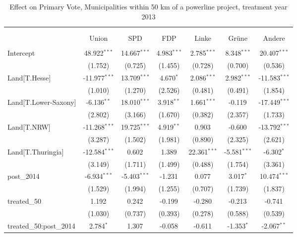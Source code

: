 \begin{table}[!htbp] \centering
  \caption{Effect on Primary Vote, Municipalities within 50 km of a powerline project, treatment year 2013}
\begin{tabular}{@{\extracolsep{5pt}}lcccccc}
\\[-1.8ex]\hline
\hline \\[-1.8ex]
\\[-1.8ex] & \multicolumn{1}{c}{Union} & \multicolumn{1}{c}{SPD} & \multicolumn{1}{c}{FDP} & \multicolumn{1}{c}{Linke} & \multicolumn{1}{c}{Grüne} & \multicolumn{1}{c}{Andere}  \\
\hline \\[-1.8ex]
 Intercept & 48.922$^{***}$ & 14.667$^{***}$ & 4.983$^{***}$ & 2.785$^{***}$ & 8.348$^{***}$ & 20.407$^{***}$ \\
  & (1.752) & (0.725) & (1.455) & (0.728) & (0.700) & (0.536) \\
 Land[T.Hesse] & -11.977$^{***}$ & 13.709$^{***}$ & 4.670$^{*}$ & 2.086$^{***}$ & 2.982$^{***}$ & -11.583$^{***}$ \\
  & (1.010) & (1.270) & (2.526) & (0.481) & (0.491) & (1.854) \\
 Land[T.Lower-Saxony] & -6.136$^{**}$ & 18.010$^{***}$ & 3.918$^{**}$ & 1.661$^{***}$ & -0.119$^{}$ & -17.449$^{***}$ \\
  & (2.802) & (3.166) & (1.670) & (0.382) & (2.357) & (1.733) \\
 Land[T.NRW] & -11.268$^{***}$ & 19.725$^{***}$ & 4.919$^{**}$ & 0.903$^{}$ & -0.600$^{}$ & -13.792$^{***}$ \\
  & (3.287) & (1.502) & (1.981) & (0.890) & (2.325) & (2.621) \\
 Land[T.Thuringia] & -12.584$^{***}$ & 0.602$^{}$ & 1.389$^{}$ & 22.361$^{***}$ & -5.581$^{***}$ & -6.302$^{*}$ \\
  & (3.149) & (1.711) & (1.499) & (0.488) & (1.754) & (3.361) \\
 post_2014 & -6.934$^{***}$ & -5.403$^{***}$ & -1.231$^{}$ & 0.077$^{}$ & 3.017$^{*}$ & 10.474$^{***}$ \\
  & (1.529) & (1.994) & (1.255) & (0.707) & (1.739) & (1.837) \\
 treated_50 & 1.192$^{}$ & 0.242$^{}$ & -0.199$^{}$ & -0.280$^{}$ & -0.213$^{}$ & -0.741$^{}$ \\
  & (1.030) & (0.737) & (0.393) & (0.278) & (0.588) & (0.539) \\
 treated_50:post_2014 & 2.784$^{*}$ & 1.307$^{}$ & -0.058$^{}$ & -0.611$^{}$ & -1.353$^{*}$ & -2.067$^{**}$ \\

\end{tabular}
\end{table}
